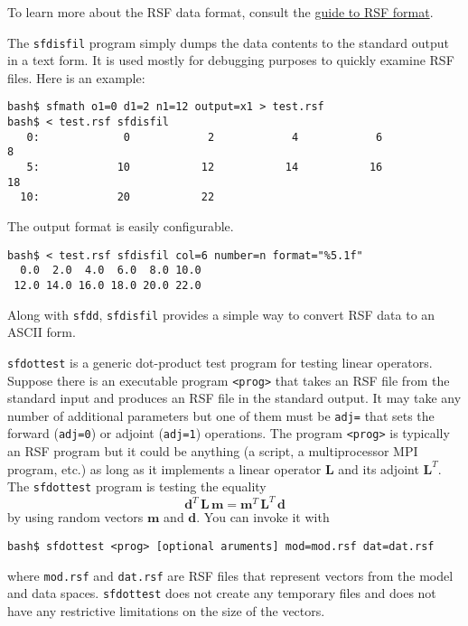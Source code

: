 To learn more about the RSF data format, consult the
\href{http://www.reproducibility.org/RSF/book/rsf/rsf/format_html/}{guide to RSF format}.

\noindent\doublebox{\parbox{\textwidth}{

}}

The \texttt{sfdisfil} program simply dumps the data contents to the standard
output in a text form. It is used mostly for debugging purposes to quickly
examine RSF files. Here is an example:
\begin{verbatim}
bash$ sfmath o1=0 d1=2 n1=12 output=x1 > test.rsf
bash$ < test.rsf sfdisfil
   0:             0            2            4            6            8
   5:            10           12           14           16           18
  10:            20           22
\end{verbatim}
The output format is easily configurable.
\begin{verbatim}
bash$ < test.rsf sfdisfil col=6 number=n format="%5.1f"
  0.0  2.0  4.0  6.0  8.0 10.0
 12.0 14.0 16.0 18.0 20.0 22.0
\end{verbatim}
Along with \texttt{sfdd}, \texttt{sfdisfil} provides a simple way to convert
RSF data to an ASCII form.

\noindent\doublebox{\parbox{\textwidth}{
    
}}

\texttt{sfdottest} is a generic dot-product test program for testing
linear operators. Suppose there is an executable program
\texttt{<prog>} that takes an RSF file from the standard input and
produces an RSF file in the standard output. It may take any number of
additional parameters but one of them must be \texttt{adj=} that sets
the forward (\texttt{adj=0}) or adjoint (\texttt{adj=1}) operations.
The program \texttt{<prog>} is typically an RSF program but it could
be anything (a script, a multiprocessor MPI program, etc.) as long as
it implements a linear operator $\mathbf{L}$ and its adjoint
$\mathbf{L}^T$. The \texttt{sfdottest} program is testing the equality
\begin{equation}
\label{eq:dptest}
\mathbf{d}^T\,\mathbf{L}\,\mathbf{m} = \mathbf{m}^T\,\mathbf{L}^T\,\mathbf{d}
\end{equation}
by using random vectors $\mathbf{m}$ and $\mathbf{d}$. You can invoke it with
\begin{verbatim}
bash$ sfdottest <prog> [optional aruments] mod=mod.rsf dat=dat.rsf
\end{verbatim}
where \texttt{mod.rsf} and \texttt{dat.rsf} are RSF files that
represent vectors from the model and data spaces. \texttt{sfdottest}
does not create any temporary files and does not have any restrictive
limitations on the size of the vectors.

